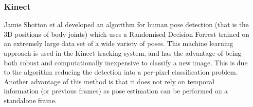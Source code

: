 \subsubsection{Kinect}

Jamie Shotton et al developed an algorithm\cite{shottonkinect} for human pose detection (that is the 3D positions of body joints) which uses a Randomised Decision Forrest trained on an extremely large data set of a wide variety of poses. This machine learning approach is used in the Kinect tracking system, and has the advantage of being both robust and computationally inexpensive to classify a new image. This is due to the algorithm reducing the detection into a per-pixel classification problem. Another advantage of this method is that it does not rely on temporal information (or previous frames) as pose estimation can be performed on a standalone frame.